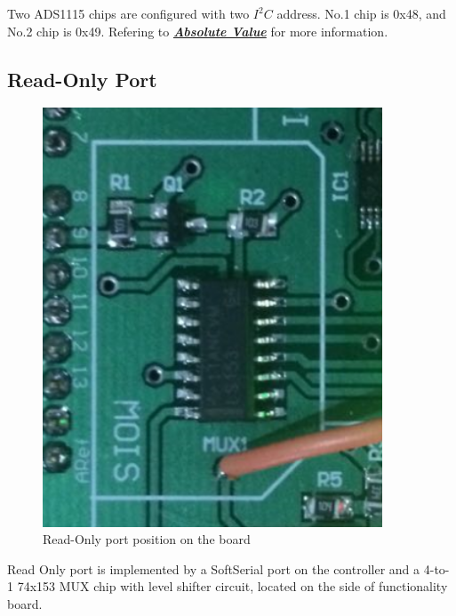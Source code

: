    Two ADS1115 chips are configured with two $I^{2}C$ address. No.1 chip is 0x48, and No.2 chip is 0x49.
    Refering to \hyperref[absValue]{\textbf{\textit{Absolute Value}}} for more information.



  \subsection{Read-Only Port}
    \label{read-only Design}
    \begin{figure}[H]
    \centering
    \includegraphics[width=0.9\textwidth]{mosPosition.png}
    \caption{\label{fig:moisture sensor position}Read-Only port position on the board}
    \end{figure}
    Read Only port is implemented by a SoftSerial port on the controller and a 4-to-1 74x153 MUX chip with level shifter circuit, located on the side of functionality board.


